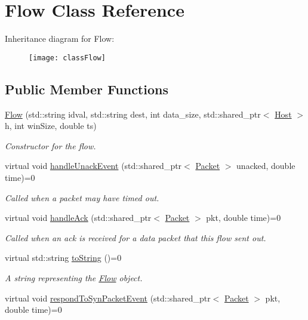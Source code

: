 \hypertarget{classFlow}{\section{\-Flow \-Class \-Reference}
\label{classFlow}
}
\-Inheritance diagram for \-Flow\-:\begin{figure}[H]
\begin{center}
\leavevmode
\texttt{[image: classFlow]}
\end{center}
\end{figure}
\subsection*{\-Public \-Member \-Functions}
\begin{DoxyCompactItemize}
\item 
\hyperlink{classFlow_ab7771ce5ed20e19fff6bf6ceb5d1adc4}{\-Flow} (std\-::string idval, std\-::string dest, int data\-\_\-size, std\-::shared\-\_\-ptr$<$ \hyperlink{classHost}{\-Host} $>$ h, int win\-Size, double ts)
\begin{DoxyCompactList}\small\item\em \-Constructor for the flow. \end{DoxyCompactList}\item 
virtual void \hyperlink{classFlow_a8a45fd871502fad3fb23987ac773a0ab}{handle\-Unack\-Event} (std\-::shared\-\_\-ptr$<$ \hyperlink{classPacket}{\-Packet} $>$ unacked, double time)=0
\begin{DoxyCompactList}\small\item\em \-Called when a packet may have timed out. \end{DoxyCompactList}\item 
virtual void \hyperlink{classFlow_ab75994d89f53573e60a1650dcaeddabb}{handle\-Ack} (std\-::shared\-\_\-ptr$<$ \hyperlink{classPacket}{\-Packet} $>$ pkt, double time)=0
\begin{DoxyCompactList}\small\item\em \-Called when an ack is received for a data packet that this flow sent out. \end{DoxyCompactList}\item 
virtual std\-::string \hyperlink{classFlow_aa74099113ee1c2298874b85ade05be98}{to\-String} ()=0
\begin{DoxyCompactList}\small\item\em \-A string representing the \hyperlink{classFlow}{\-Flow} object. \end{DoxyCompactList}\item 
\hypertarget{classFlow_a1b9f70de92594ba82c5a1b16298f3811}{virtual void \hyperlink{classFlow_a1b9f70de92594ba82c5a1b16298f3811}{respond\-To\-Syn\-Packet\-Event} (std\-::shared\-\_\-ptr$<$ \hyperlink{classPacket}{\-Packet} $>$ pkt, double time)=0}\label{classFlow_a1b9f70de92594ba82c5a1b16298f3811}


\end{DoxyCompactItemize}
